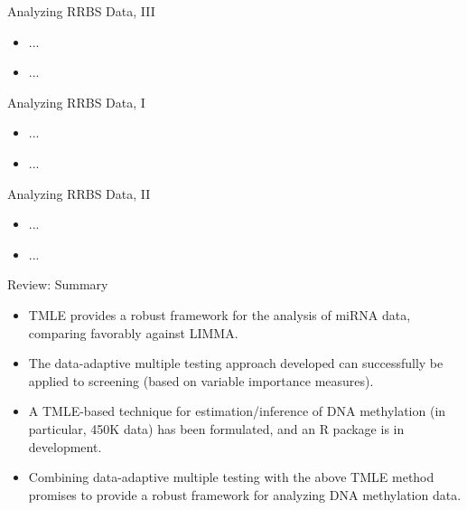 \documentclass[12pt,t]{beamer}
\begin{document}
\begin{frame}[c]{Analyzing RRBS Data, III}

\begin{center}
\begin{itemize}
  \item ...
  \item ...
\end{itemize}
\end{center}



\end{frame}



\begin{frame}[c]{Analyzing RRBS Data, I}

\begin{center}
\begin{itemize}
  \item ...
  \item ...
\end{itemize}
\end{center}



\end{frame}



\begin{frame}[c]{Analyzing RRBS Data, II}

\begin{center}
\begin{itemize}
  \item ...
  \item ...
\end{itemize}
\end{center}



\end{frame}



\begin{frame}[c]{Review: Summary}

\begin{center}
\begin{itemize}
  \itemsep12pt
  \item TMLE provides a robust framework for the analysis of miRNA data,
    comparing favorably against LIMMA.
  \item The data-adaptive multiple testing approach developed can successfully
    be applied to screening (based on variable importance measures).
  \item A TMLE-based technique for estimation/inference of DNA methylation
    (in particular, 450K data) has been formulated, and an R package is in
    development.
  \item Combining data-adaptive multiple testing with the above TMLE method
    promises to provide a robust framework for analyzing DNA methylation data.
\end{itemize}
\end{center}


\end{frame}
\end{document}

